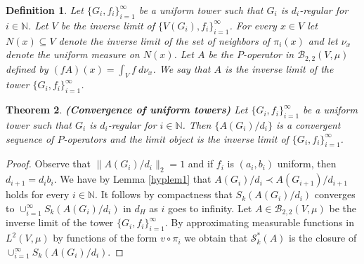 \documentclass[a4wider]{amsart}
\newtheorem{theorem}{Theorem}[section]
\newtheorem{definition}[theorem]{Definition}
\theoremstyle{definitionbreak}\newtheorem{D}[theorem]{Definition}
\theoremstyle{definitionbreak}\newtheorem*{D*}{Definition}
\begin{document}
\begin{definition} Let $\{G_i,f_i\}_{i=1}^\infty$ be a uniform tower such that $G_i$ is $d_i$-regular for $i\in\mathbb{N}$. Let $V$ be the inverse limit of $\{V(G_i),f_i\}_{i=1}^\infty$. For every $x\in V$ let $N(x)\subseteq V$ denote the inverse limit of the set of neighbors of $\pi_i(x)$ and let $\nu_x$ denote the uniform measure on $N(x)$. Let $A$ be the $P$-operator in $\mathcal{B}_{2,2}(V,\mu)$ defined by $(fA)(x)=\int_{V} f~d\nu_x$. We say that $A$ is the inverse limit of the tower $\{G_i,f_i\}_{i=1}^\infty$.
\end{definition}

\begin{theorem}\label{hypthm}{\bf (Convergence of uniform towers)} Let $\{G_i,f_i\}_{i=1}^\infty$ be a uniform tower such that $G_i$ is $d_i$-regular for $i\in\mathbb{N}$. Then $\{A(G_i)/d_i\}$ is a convergent sequence of $P$-operators and the limit object is the inverse limit of $\{G_i,f_i\}_{i=1}^\infty$. 
\end{theorem}

\begin{proof} Observe that $\|A(G_i)/d_i\|_2=1$ and if $f_i$ is $(a_i,b_i)$ uniform, then $d_{i+1}=d_ib_i$. We have by Lemma \ref{hyplem1} that $A(G_i)/d_i\prec A(G_{i+1})/d_{i+1}$ holds for every $i\in\mathbb{N}$. It follows by compactness that $S_k(A(G_i)/d_i)$ converges to $\cup_{i=1}^\infty S_k(A(G_i)/d_i)$ in $d_H$ as $i$ goes to infinity. Let $A\in\mathcal{B}_{2,2}(V,\mu)$ be the inverse limit of the tower $\{G_i,f_i\}_{i=1}^\infty$. By approximating measurable functions in $L^2(V,\mu)$ by functions of the form $v\circ\pi_i$ we obtain that $\mathcal{S}_k^*(A)$ is the closure of $\cup_{i=1}^\infty S_k(A(G_i)/d_i)$. 
\end{proof}
\end{document}

